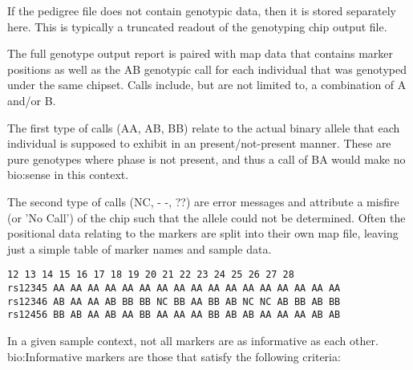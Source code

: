 If the pedigree file does not contain genotypic data, then it is stored separately here. This is typically a truncated readout of the genotyping chip output file.

The full genotype output report is paired with map data that contains marker positions as well as the AB genotypic call for each individual that was genotyped under the same chipset. Calls include, but are not limited to, a combination of A and/or B.

The first type of calls (AA, AB, BB) relate to the actual binary allele that each individual is supposed to exhibit in an present/not-present manner. These are pure genotypes where phase is not present, and thus a call of BA would make no \gls{bio:sense} in this context.

The second type of calls (NC, - -, ??) are error messages and attribute a misfire (or 'No Call') of the chip such that the allele could not be determined.
Often the positional data relating to the markers are split into their own map file, leaving just a simple table of marker names and sample data.

\begingroup
\vspace{10pt}
\begin{lstlisting}
12 13 14 15 16 17 18 19 20 21 22 23 24 25 26 27 28
rs12345 AA AA AA AA AA AA AA AA AA AA AA AA AA AA AA AA AA
rs12346 AB AA AA AB BB BB NC BB AA BB AB NC NC AB BB AB BB
rs12456 BB AB AA AB AA BB AA AA AA BB AB AB AA AA AA AB AB
\end{lstlisting}
\vspace{-10pt}
\endgroup

In a given sample context, not all markers are as informative as each other. \gls{bio:Informative marker}s are those that satisfy the following criteria:\label{informativemarkers}

